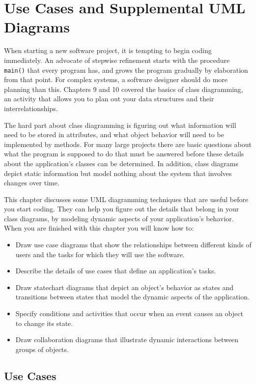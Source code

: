 \chapter{Use Cases and Supplemental UML Diagrams}

When starting a new software project, it is tempting to begin coding
immediately. An advocate of stepwise refinement starts with the
procedure \texttt{main()} that every program has, and grows the program
gradually by elaboration from that point. For complex systems, a
software designer should do more planning than this. Chapters 9 and 10
covered the basics of class diagramming, an activity that allows you to
plan out your data structures and their interrelationships.

The hard part about class diagramming is figuring out what information
will need to be stored in attributes, and what object behavior will
need to be implemented by methods. For many large projects there are
basic questions about what the program is supposed to do that must be
answered before these details about the application's
classes can be determined. In addition, class diagrams depict static
information but model nothing about the system that involves changes
over time.

This chapter discusses some UML diagramming techniques that are useful
before you start coding. They can help you figure out the details that
belong in your class diagrams, by modeling dynamic aspects of your
application's behavior. When you are finished with
this chapter you will know how to:

\begin{itemize}
\item Draw use case diagrams that show the relationships between
      different kinds of users and the tasks for which they will use the
      software.
\item Describe the details of use cases that define an application's tasks.
\item Draw statechart diagrams that depict an object's behavior as states and
      transitions between states that model the dynamic aspects of the
      application.
\item Specify conditions and activities that occur when an event causes an
      object to change its state.
\item Draw collaboration diagrams that illustrate dynamic interactions between
      groups of objects.
\end{itemize}


\section{Use Cases}

